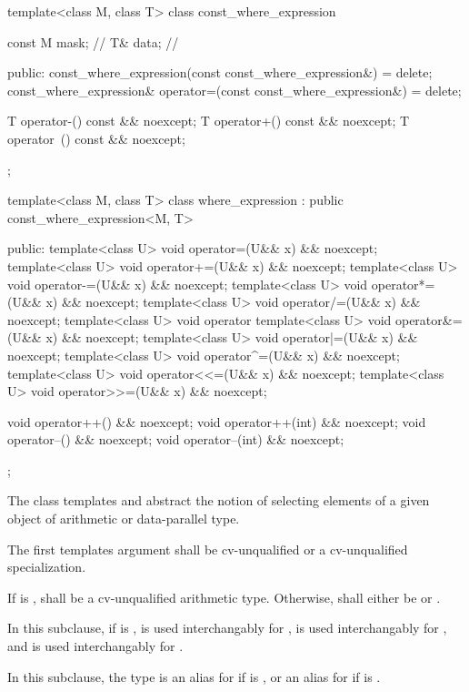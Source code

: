 \begin{codeblock}
template<class M, class T> class const_where_expression {
  const M mask;    // \expos
  T& data;         // \expos

public:
  const_where_expression(const const_where_expression&) = delete;
  const_where_expression& operator=(const const_where_expression&) = delete;

  T operator-() const && noexcept;
  T operator+() const && noexcept;
  T operator~() const && noexcept;
};

template<class M, class T>
class where_expression : public const_where_expression<M, T> {
public:
  template<class U> void operator=(U&& x) && noexcept;
  template<class U> void operator+=(U&& x) && noexcept;
  template<class U> void operator-=(U&& x) && noexcept;
  template<class U> void operator*=(U&& x) && noexcept;
  template<class U> void operator/=(U&& x) && noexcept;
  template<class U> void operator%
  template<class U> void operator&=(U&& x) && noexcept;
  template<class U> void operator|=(U&& x) && noexcept;
  template<class U> void operator^=(U&& x) && noexcept;
  template<class U> void operator<<=(U&& x) && noexcept;
  template<class U> void operator>>=(U&& x) && noexcept;

  void operator++() && noexcept;
  void operator++(int) && noexcept;
  void operator--() && noexcept;
  void operator--(int) && noexcept;
};
\end{codeblock}

\pnum
The class templates  and  abstract the notion of selecting elements of a given object of arithmetic or data-parallel type.

\pnum
The first templates argument  shall be cv-unqualified  or a cv-unqualified  specialization.

\pnum
If  is ,  shall be a cv-unqualified arithmetic type. Otherwise,  shall either be  or .

\pnum
In this subclause, if  is ,  is used interchangably for ,  is used interchangably for , and  is used interchangably for .

\pnum
In this subclause, the type  is an alias for  if  is , or an alias for  if  is .

